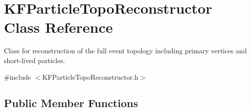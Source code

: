 \hypertarget{classKFParticleTopoReconstructor}{}\section{K\+F\+Particle\+Topo\+Reconstructor Class Reference}
\label{classKFParticleTopoReconstructor}


Class for reconstruction of the full event topology including primary vertices and short-\/lived particles.  




{\ttfamily \#include $<$K\+F\+Particle\+Topo\+Reconstructor.\+h$>$}

\subsection*{Public Member Functions}
